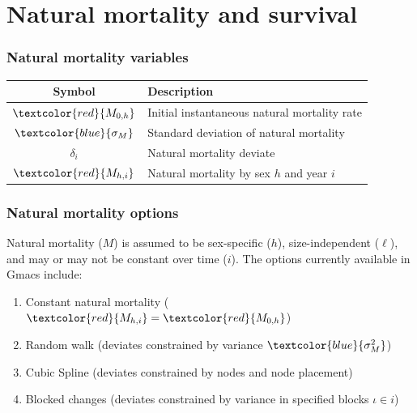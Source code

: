 \documentclass{beamer}
\begin{document}

\section{Natural mortality and survival}


\begin{frame}
\frametitle{Natural mortality variables}
\begin{table}
  \centering
  \begin{tabular}{cl}
  \hline
  Symbol  & Description \\
  \hline
      $\textcolor{red}{M_{0,h}}$ & Initial instantaneous natural mortality rate \\
      $\textcolor{blue}{\sigma_M}$ & Standard deviation of natural mortality \\
      $\delta_i$ & Natural mortality deviate \\
      $\textcolor{red}{M_{h,i}}$ & Natural mortality by sex $h$ and year $i$ \\
  \hline
  \end{tabular}
\end{table}
\end{frame}


\begin{frame}
\frametitle{Natural mortality options}
Natural mortality ($M$) is assumed to be sex-specific ($h$), size-independent
($\ell$), and may or may not be constant over time ($i$). The options currently
available in Gmacs include:
\begin{enumerate}
\item Constant natural mortality ($\textcolor{red}{M_{h,i}} = \textcolor{red}{M_{0,h}}$)
\item Random walk (deviates constrained by variance $\textcolor{blue}{\sigma^2_M}$)
\item Cubic Spline (deviates constrained by nodes and node placement)
\item Blocked changes (deviates constrained by variance in specified blocks
  $\iota \in i$)
\end{enumerate}
\end{frame}
\end{document}
